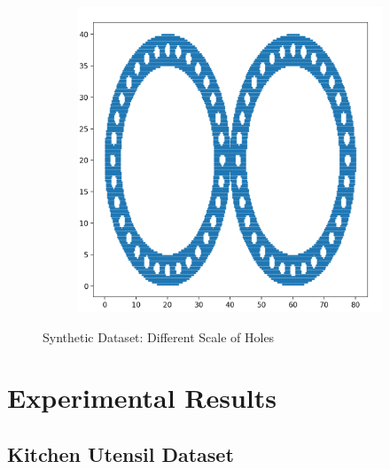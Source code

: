 \documentclass[10pt]{article}
\begin{document}
\begin{figure}[H]
\begin{subfigure}[h]{0.2\textwidth}
    \end{subfigure}%
    \begin{subfigure}[h]{0.2\textwidth}
        \includegraphics[width=\linewidth]{ms_4}
    \end{subfigure}%
    \caption{Synthetic Dataset: Different Scale of Holes}
    \label{fig:multiscale_dataset}
\end{figure}

\section{Experimental Results}

\subsection{Kitchen Utensil Dataset}
\end{document}
